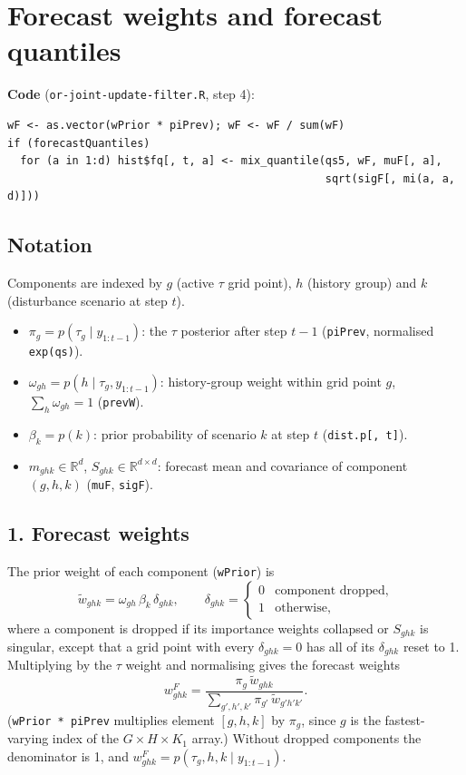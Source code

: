 \documentclass[11pt]{article}
\begin{document}
\section*{Forecast weights and forecast quantiles}

\textbf{Code} (\texttt{or-joint-update-filter.R}, step 4):
\begin{lstlisting}
wF <- as.vector(wPrior * piPrev); wF <- wF / sum(wF)
if (forecastQuantiles)
  for (a in 1:d) hist$fq[, t, a] <- mix_quantile(qs5, wF, muF[, a],
                                                 sqrt(sigF[, mi(a, a, d)]))
\end{lstlisting}

\subsection*{Notation}
Components are indexed by $g$ (active $\tau$ grid point), $h$ (history group) and
$k$ (disturbance scenario at step $t$).
\begin{itemize}
  \item $\pi_g = p(\tau_g \mid y_{1:t-1})$: the $\tau$ posterior after step $t-1$ (\texttt{piPrev}, normalised \texttt{exp(qs)}).
  \item $\omega_{gh} = p(h \mid \tau_g, y_{1:t-1})$: history-group weight within grid point $g$, $\sum_h \omega_{gh} = 1$ (\texttt{prevW}).
  \item $\beta_k = p(k)$: prior probability of scenario $k$ at step $t$ (\texttt{dist.p[, t]}).
  \item $m_{ghk} \in \mathbb{R}^d$, $S_{ghk} \in \mathbb{R}^{d\times d}$: forecast mean and covariance of component $(g,h,k)$ (\texttt{muF}, \texttt{sigF}).
\end{itemize}

\subsection*{1. Forecast weights}
The prior weight of each component (\texttt{wPrior}) is
\[
  \tilde w_{ghk} = \omega_{gh}\,\beta_k\, \delta_{ghk},
  \qquad
  \delta_{ghk} =
  \begin{cases}
    0 & \text{component dropped},\\
    1 & \text{otherwise,}
  \end{cases}
\]
where a component is dropped if its importance weights collapsed or $S_{ghk}$ is singular,
except that a grid point with every $\delta_{ghk} = 0$ has all of its $\delta_{ghk}$ reset to 1.
Multiplying by the $\tau$ weight and normalising gives the forecast weights
\[
  w^F_{ghk} = \frac{\pi_g\, \tilde w_{ghk}}{\sum_{g',h',k'} \pi_{g'}\, \tilde w_{g'h'k'}} .
\]
(\texttt{wPrior * piPrev} multiplies element $[g,h,k]$ by $\pi_g$, since $g$ is the
fastest-varying index of the $G\times H\times K_1$ array.)
Without dropped components the denominator is 1, and $w^F_{ghk} = p(\tau_g, h, k \mid y_{1:t-1})$.
\end{document}
